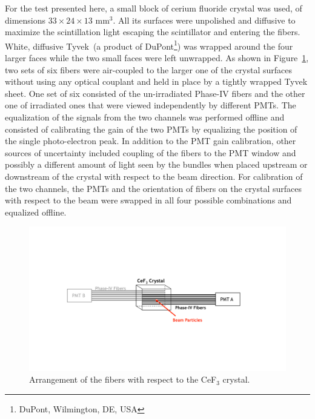 \documentclass[a4paper,11pt]{article}
\begin{document}
For the test presented here, a small block of cerium fluoride crystal was used, of dimensions $33\times 24 \times13$ mm$^3$. All its surfaces were unpolished and diffusive to maximize the scintillation light escaping the scintillator and entering the fibers. White, diffusive Tyvek\texttrademark~(a product of DuPont\footnote{DuPont, Wilmington, DE, USA}) was wrapped around the four larger faces while the two small faces were left unwrapped. As shown in Figure~\ref{fig:CeF3Arrangement}, two sets of six fibers were air-coupled to the larger one of the crystal surfaces without using any optical couplant and held in place by a tightly wrapped Tyvek sheet. One set of six consisted of the un-irradiated Phase-IV fibers and the other one of irradiated ones that were viewed independently by different PMTs. The equalization of the signals from the two channels was performed offline and consisted of calibrating the gain of the two PMTs by equalizing the position of the single photo-electron peak. In addition to the PMT gain calibration, other sources of uncertainty included coupling of the fibers to the PMT window and possibly a different amount of light seen by the bundles when placed upstream or downstream of the crystal with respect to the beam direction. For calibration of the two channels, the PMTs and the orientation of fibers on the crystal surfaces with respect to the beam were swapped in all four possible combinations and equalized offline.
\begin{figure}[ht]
\begin{center}\vspace{-1pc}
      \includegraphics[width=14 cm]{Figures/CeF3Arrangement.pdf}
\caption{\small Arrangement of the fibers with respect to the CeF$_3$ crystal.}
    \label{fig:CeF3Arrangement}
\end{center}
\end{figure}
\end{document}
